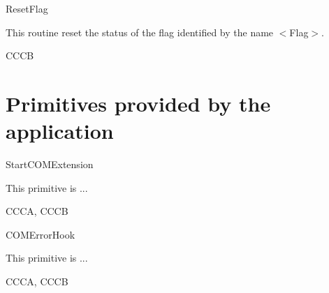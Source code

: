 \begin{function}{ResetFlag}
	\begin{fundescription}
	This routine reset the status of the flag identified by the name $<$Flag$>$.
   	\end{fundescription}

	\begin{funconformance}
     	CCCB
     	\end{funconformance}
\end{function}



\pagebreak






\section{Primitives provided by the application}


\begin{function_nopb}{StartCOMExtension}
  \begin{fundescription}
    This primitive is ...
  \end{fundescription}
  \begin{funreturn}
   \end{funreturn}
  \begin{funconformance}
    CCCA, CCCB
  \end{funconformance}
\end{function_nopb}

\begin{function_nopb}{COMErrorHook}
  \begin{fundescription}
        This primitive is ...
  \end{fundescription}
  \begin{funparameters}
  \end{funparameters}
  \begin{funconformance}
    CCCA, CCCB
  \end{funconformance}
\end{function_nopb}
\pagebreak





